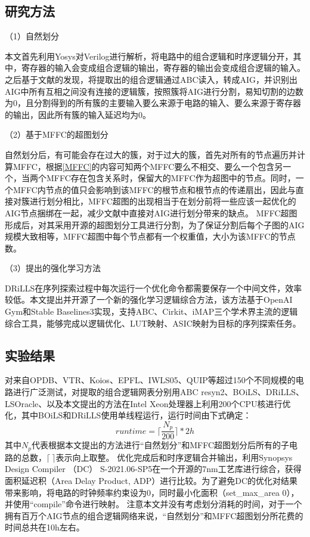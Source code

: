 \subsection{研究方法}

（1）自然划分

本文首先利用Yosys对Verilog进行解析，将电路中的组合逻辑和时序逻辑分开，其中，寄存器的输入会变成组合逻辑的输出，寄存器的输出会变成组合逻辑的输入。之后基于文献\cite{Moucheng_Yang}的发现，将提取出的组合逻辑通过ABC读入，转成AIG，并识别出AIG中所有互相之间没有连接的逻辑簇，按照簇将AIG进行分割，易知切割的边数为0，且分割得到的所有簇的主要输入要么来源于电路的输入、要么来源于寄存器的输出，因此所有簇的输入延迟均为0。

（2）基于MFFC的超图划分

自然划分后，有可能会存在过大的簇，对于过大的簇，首先对所有的节点遍历并计算MFFC，根据\ref{MFFC}的内容可知两个MFFC要么不相交、要么一个包含另一个，当两个MFFC存在包含关系时，保留大的MFFC作为超图中的节点。同时，一个MFFC内节点的值只会影响到该MFFC的根节点和根节点的传递扇出，因此与直接对簇进行划分相比，MFFC超图的出现相当于在划分前将一些应该一起优化的AIG节点捆绑在一起，减少文献\cite{LS:LSOracle}中直接对AIG进行划分带来的缺点。
MFFC超图形成后，对其采用开源的超图划分工具\cite{KaHyPar}进行分割，为了保证分割后每个子图的AIG规模大致相等，MFFC超图中每个节点都有一个权重值，大小为该MFFC的节点数。

（3）提出的强化学习方法

DRiLLS\cite{LS:DRiLLS}在序列探索过程中每次运行一个优化命令都需要保存一个中间文件，效率较低。本文提出并开源了一个新的强化学习逻辑综合方法，该方法基于OpenAI Gym\cite{AI:gym}和Stable Baselines3\cite{AI:stable-baselines3}实现，支持ABC\cite{LS:ABC}、Cirkit\cite{LS:cirkit}、iMAP\cite{LS:iMAP}三个学术界主流的逻辑综合工具，能够完成以逻辑优化、LUT映射、ASIC映射为目标的序列探索任务。

\subsection{实验结果}

对来自OPDB\cite{LS:OPDB}、VTR\cite{FPGA:vtr8}、Koios\cite{FPGA:Koios}、EPFL\cite{LS:EPFL_benchs_iwls,LS:EPFL_benchs_github}、IWLS05\cite{LS:iwls05}、QUIP\cite{LS:quip}等超过150个不同规模的电路进行广泛测试，对提取的组合逻辑网表分别用ABC resyn2、BOiLS\cite{LS:BOiLS}、DRiLLS\cite{LS:DRiLLS}、LSOracle\cite{LS:LSOracle}、以及本文提出的方法在Intel Xeon处理器上利用200个CPU核进行优化，其中BOiLS和DRiLLS使用单线程运行，运行时间由下式确定：
\begin{equation}
    runtime = \lceil \frac{N_{p}}{200} \rceil * 2 h
\end{equation}
其中$N_{p}$代表根据本文提出的方法进行“自然划分”和MFFC超图划分后所有的子电路的总数，$\lceil \ \rceil$表示向上取整。
优化完成后和时序逻辑合并输出，利用Synopsys Design Compiler （DC） S-2021.06-SP5在一个开源的7nm工艺库\cite{ASAP7_github}进行综合，获得面积延迟积（Area Delay Product, ADP）进行比较。为了避免DC的优化对结果带来影响，将电路的时钟频率约束设为0，同时最小化面积（set\_max\_area 0），并使用“compile”命令进行映射。
注意本文并没有考虑划分消耗的时间，对于一个拥有百万个AIG节点的组合逻辑网络来说，“自然划分”和MFFC超图划分所花费的时间总共在10h左右。

